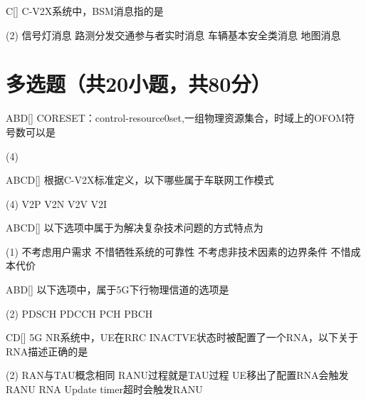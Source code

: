 \begin{choice}{C}[]
    C-V2X系统中，BSM消息指的是
    \begin{tasks}(2)
        \task 信号灯消息
        \task 路测分发交通参与者实时消息
        \task 车辆基本安全类消息
        \task 地图消息
    \end{tasks}
\end{choice}

\section{多选题（共20小题，共80分）}

\begin{choice}{\;ABD\;}[]
    CORESET：control-resource0set,一组物理资源集合，时域上的OFOM符号数可以是
    \begin{tasks}(4)
    \end{tasks}
\end{choice}

\begin{choice}{\;ABCD\;}[]
    根据C-V2X标准定义，以下哪些属于车联网工作模式
    \begin{tasks}(4)
        \task V2P
        \task V2N
        \task V2V
        \task V2I
    \end{tasks}
\end{choice}

\begin{choice}{\;ABCD\;}[]
    以下选项中属于为解决复杂技术问题的方式特点为
    \begin{tasks}(1)
        \task 不考虑用户需求
        \task 不惜牺牲系统的可靠性
        \task 不考虑非技术因素的边界条件
        \task 不惜成本代价
    \end{tasks}
\end{choice}

\begin{choice}{\;ABD\;}[]
    以下选项中，属于5G下行物理信道的选项是
    \begin{tasks}(2)
        \task PDSCH
        \task PDCCH
        \task PCH
        \task PBCH
    \end{tasks}
\end{choice}


\begin{choice}{\;CD\;}[]
    5G NR系统中，UE在RRC INACTVE状态时被配置了一个RNA，以下关于RNA描述正确的是
    \begin{tasks}(2)
        \task RAN与TAU概念相同
        \task RANU过程就是TAU过程
        \task UE移出了配置RNA会触发RANU
        \task RNA Update timer超时会触发RANU
    \end{tasks}
\end{choice}


